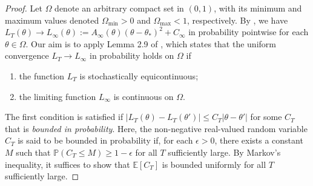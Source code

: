 \documentclass[a4paper, 11pt]{article}
\newcommand{\E}{\mathbb E}
\theoremstyle{definition}
\begin{document}
\begin{proof}
    Let $\Omega$ denote an arbitrary compact set in $(0, 1)$, with its minimum and maximum values denoted $\Omega_{\text{min}} > 0$ and $\Omega_{\text{max}} < 1$, respectively.
    By , we have $L_T(\theta) \to L_\infty(\theta) := A_\infty(\theta) (\theta - \theta_*)^2 + C_\infty$ in probability pointwise for each $\theta \in \Omega$.
    Our aim is to apply Lemma 2.9 of \cite{Newey1994}, which states that the uniform convergence $L_T \to L_\infty$ in probability holds on $\Omega$ if
    \begin{enumerate}
        \item the function $L_T$ is stochastically equicontinuous;
        \item the limiting function $L_\infty$ is continuous on $\Omega$.
    \end{enumerate}
    The first condition is satisfied if $| L_T(\theta) - L_T(\theta') | \le C_T | \theta - \theta' |$ for some $C_T$ that is \emph{bounded in probability}.
    Here, the non-negative real-valued random variable $C_T$ is said to be bounded in probability if, for each $\epsilon > 0$, there exists a constant $M$ such that $\mathbb{P}( C_T \le M ) \ge 1 - \epsilon$ for all $T$ sufficiently large.
    By Markov's inequality, it suffices to show that $\E[ C_T ]$ is bounded uniformly for all $T$ sufficiently large.
    

\end{proof}
\end{document}
